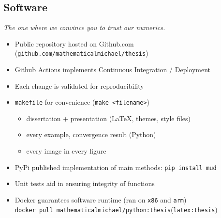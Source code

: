 \begin{frame}
\begin{figure}
\end{figure}
\end{frame}


\subsection{Software}

\begin{frame}{\it The one where we convince you to trust our numerics.}

\begin{itemize}
	\item Public repository hosted on Github.com ({\tt github.com/mathematicalmichael/thesis})
	\item Github Actions implements Continuous Integration / Deployment
	\item Each change is validated for reproducibility
	\item {\tt makefile} for convenience ({\tt make <filename>})
	\begin{itemize}
		\item dissertation + presentation (\LaTeX, themes, style files)
		\item every example, convergence result (Python)
		\item every image in every figure
	\end{itemize}
	\item PyPi published implementation of main methods: {\tt pip install mud}
	\item Unit tests aid in ensuring integrity of functions
	\item Docker guarantees software runtime (ran on {\tt x86} and {\tt arm}) \\ {\tt docker pull mathematicalmichael/python:thesis}({\tt latex:thesis})
\end{itemize}


\end{frame}
